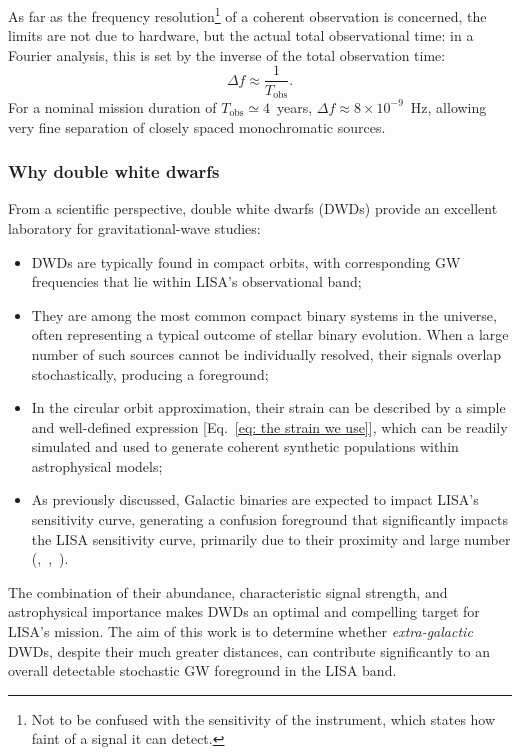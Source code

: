 As far as the frequency resolution\footnote{Not to be confused with the sensitivity of the instrument, which states how faint of a signal it can detect.} of a coherent observation is concerned, the limits are not due to hardware, but the actual total observational time: in a Fourier analysis, this is set by the inverse of the total observation time:  
\begin{equation}
\Delta f \approx \frac{1}{T_{\mathrm{obs}}}.
\end{equation}
For a nominal mission duration of $T_{\mathrm{obs}} \simeq 4$~years, $\Delta f \approx 8\times 10^{-9}$~Hz, allowing very fine separation of closely spaced monochromatic sources.

\subsubsection{Why double white dwarfs}
From a scientific perspective, double white dwarfs (DWDs) provide an excellent laboratory for gravitational-wave studies:  
\begin{itemize}
    \item DWDs are typically found in compact orbits, with corresponding GW frequencies that lie within LISA's observational band;  
    \item They are among the most common compact binary systems in the universe, often representing a typical outcome of stellar binary evolution. When a large number of such sources cannot be individually resolved, their signals overlap stochastically, producing a foreground;  
    \item In the circular orbit approximation, their strain can be described by a simple and well-defined expression [Eq.~\eqref{eq: the strain we use}], which can be readily simulated and used to generate coherent synthetic populations within astrophysical models;  
    \item As previously discussed, Galactic binaries are expected to impact LISA’s sensitivity curve, generating a confusion foreground that significantly impacts the LISA sensitivity curve, primarily due to their proximity and large number (\cite{osti_6282329},~\cite{Nelemans_2001},~\cite{LISA_ref}).
\end{itemize}  
The combination of their abundance, characteristic signal strength, and astrophysical importance makes DWDs an optimal and compelling target for LISA’s mission.
The aim of this work is to determine whether \textit{extra-galactic} DWDs, despite their much greater distances, can contribute significantly to an overall detectable stochastic GW foreground in the LISA band.
